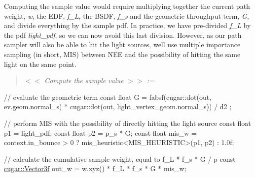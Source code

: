\begin{DoxyParagraph}{}
Computing the sample value would require multiplying together the current path weight, {\itshape w}, the E\+DF, {\itshape f\+\_\+L}, the B\+S\+DF, {\itshape f\+\_\+s} and the geometric throughput term, {\itshape G}, and divide everything by the sample pdf. In practice, we have pre-\/divided {\itshape f\+\_\+L} by the pdf {\itshape light\+\_\+pdf}, so we can now avoid this last division. However, as our path sampler will also be able to hit the light sources, we\textquotesingle{}ll use multiple importance sampling (in short, M\+IS) between N\+EE and the possibility of hitting the same light on the same point. ~\newline
\label{_hello_renderer_page_Compute_the_sample_value_anchor}%
%
 \begin{quote}
{\itshape  $<$$<$ Compute the sample value $>$$>$ \+:= }

\end{quote}

\begin{DoxyCode}
\textcolor{comment}{// evaluate the geometric term}
\textcolor{keyword}{const} \textcolor{keywordtype}{float} G = fabsf(cugar::dot(out, ev.geom.normal\_s) * cugar::dot(out, light\_vertex\_geom.normal\_s)) / d2
      ;

\textcolor{comment}{// perform MIS with the possibility of directly hitting the light source}
\textcolor{keyword}{const} \textcolor{keywordtype}{float} p1 = light\_pdf;
\textcolor{keyword}{const} \textcolor{keywordtype}{float} p2 = p\_s * G;
\textcolor{keyword}{const} \textcolor{keywordtype}{float} mis\_w = context.in\_bounce > 0 ? mis\_heuristic<MIS\_HEURISTIC>(p1, p2) : 1.0f;

\textcolor{comment}{// calculate the cumulative sample weight, equal to f\_L * f\_s * G / p}
\textcolor{keyword}{const} \hyperlink{structcugar_1_1_vector}{cugar::Vector3f} out\_w = w.xyz() * f\_L * f\_s * G * mis\_w;
\end{DoxyCode}

\end{DoxyParagraph}
